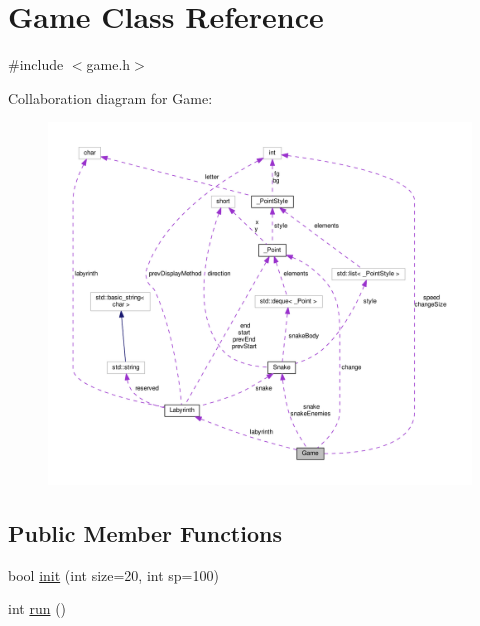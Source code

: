 \hypertarget{class_game}{\section{Game Class Reference}
\label{class_game}
}


{\ttfamily \#include $<$game.\-h$>$}



Collaboration diagram for Game\-:
\nopagebreak
\begin{figure}[H]
\begin{center}
\leavevmode
\includegraphics[width=350pt]{class_game__coll__graph}
\end{center}
\end{figure}
\subsection*{Public Member Functions}
\begin{DoxyCompactItemize}
\item 
bool \hyperlink{class_game_a66e1800ff072c0b4e737ac51430630db}{init} (int size=20, int sp=100)
\item 
int \hyperlink{class_game_a99fb161fbbe87d25a8b73265a0611e58}{run} ()
\end{DoxyCompactItemize}
